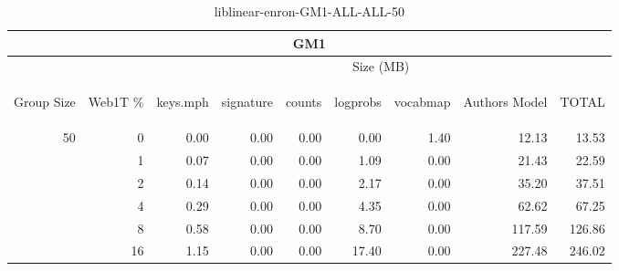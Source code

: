 \begin{center}
\begin{table}[htbp]
\begin{tabular}{ | r | r | r | r | r | r | r | r | r |}
\hline
\multicolumn{9}{|c|}{GM1}\\
\hline
 & & \multicolumn{7}{|c|}{Size (MB)}\\ \cline{3-9}
\begin{sideways}Group Size\end{sideways} & \begin{sideways}Web1T \% \end{sideways} & \begin{sideways}keys.mph\end{sideways} & \begin{sideways}signature\end{sideways} & \begin{sideways}counts\end{sideways} & \begin{sideways}logprobs\end{sideways} & \begin{sideways}vocabmap\end{sideways} & \begin{sideways}Authors Model \end{sideways} & \begin{sideways}TOTAL\end{sideways}\\
\hline
\multirow{5}{*}{50}
 & 0 & 0.00 & 0.00 & 0.00 & 0.00 & 1.40 & 12.13 & 13.53\\ \cline{2-9}
 & 1 & 0.07 & 0.00 & 0.00 & 1.09 & 0.00 & 21.43 & 22.59\\ \cline{2-9}
 & 2 & 0.14 & 0.00 & 0.00 & 2.17 & 0.00 & 35.20 & 37.51\\ \cline{2-9}
 & 4 & 0.29 & 0.00 & 0.00 & 4.35 & 0.00 & 62.62 & 67.25\\ \cline{2-9}
 & 8 & 0.58 & 0.00 & 0.00 & 8.70 & 0.00 & 117.59 & 126.86\\ \cline{2-9}
 & 16 & 1.15 & 0.00 & 0.00 & 17.40 & 0.00 & 227.48 & 246.02\\ \cline{2-9}
\hline
\end{tabular}
\caption{liblinear-enron-GM1-ALL-ALL-50}
\label{table:liblinear-enron-GM1-ALL-ALL-50}
\end{table}
\end{center}

